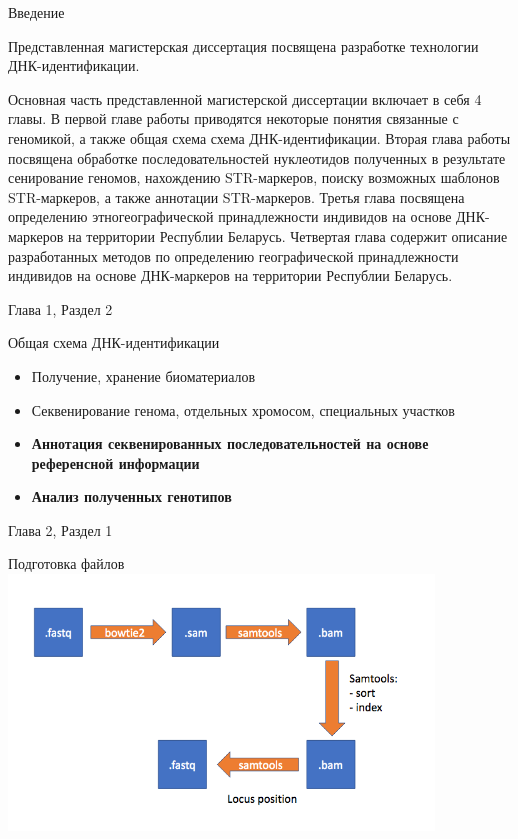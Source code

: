 \documentclass[8pt]{beamer}
\begin{document}
\begin{frame}{Введение}
    \begin{block}{Представленная магистерская диссертация посвящена разработке технологии ДНК-идентификации.}
    \end{block}

    \begin{block}{}
        Основная часть представленной магистерской диссертации включает в себя 4 главы.
        В первой главе работы приводятся некоторые понятия связанные с геномикой,
        а также общая схема схема ДНК-идентификации.
        Вторая глава работы посвящена обработке последовательностей нуклеотидов полученных в результате
        сенирование геномов, нахождению STR-маркеров, поиску возможных шаблонов STR-маркеров,
        а также аннотации STR-маркеров.
        Третья глава посвящена определению этногеографической принадлежности индивидов на основе ДНК-маркеров на территории Республии Беларусь.
        Четвертая глава содержит описание разработанных методов по определению географической принадлежности индивидов на основе ДНК-маркеров на территории Республии Беларусь.
    \end{block}
\end{frame}

\begin{frame}{Глава 1, Раздел 2}
    \begin{block}{Общая схема ДНК-идентификации}
        \begin{itemize}
            \item Получение, хранение биоматериалов
            \item Секвенирование генома, отдельных хромосом, специальных участков
            \item \textbf{Аннотация секвенированных последовательностей на основе референсной информации}
            \item \textbf{Анализ полученных генотипов}
        \end{itemize}
    \end{block}
\end{frame}

\begin{frame}{Глава 2, Раздел 1}
    \begin{block}{Подготовка файлов}
        \includegraphics[height=6.8cm]{images/locus_r.png}
        \centering
    \end{block}
\end{frame}
\end{document}
